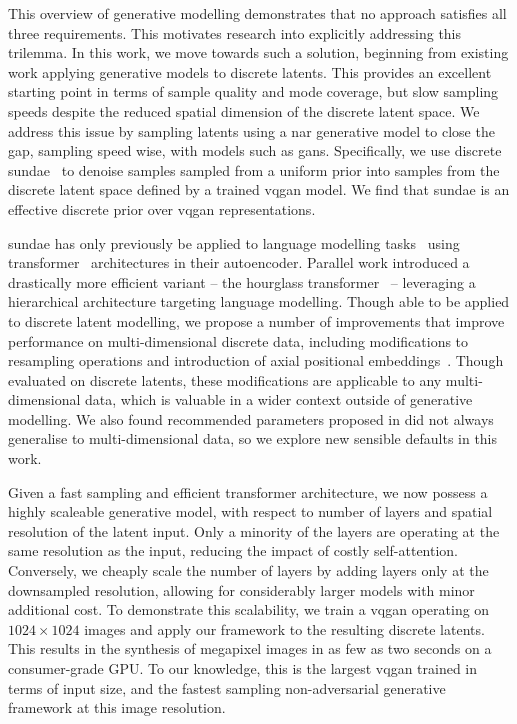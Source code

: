 This overview of generative modelling demonstrates that no approach satisfies
all three requirements. This motivates research into explicitly addressing this
trilemma. In this work, we move towards such a solution, beginning from existing
work applying generative models to discrete latents. This provides an excellent
starting point in terms of sample quality and mode coverage, but slow sampling
speeds despite the reduced spatial dimension of the discrete latent space. We
address this issue by sampling latents using a \gls{nar} generative model to
close the gap, sampling speed wise, with models such as \glspl{gan}.
Specifically, we use discrete \gls{sundae}~\cite{savinov2022stepunrolled} to
denoise samples sampled from a uniform prior into samples from the discrete
latent space defined by a trained \gls{vqgan} model. We find that
\gls{sundae} is an effective discrete prior over \gls{vqgan} representations.

\Gls{sundae} has only previously be applied to language modelling
tasks~\cite{savinov2022stepunrolled} using
transformer~\cite{vaswani2017attention} architectures in their autoencoder.
Parallel work introduced a drastically more efficient variant -- the hourglass
transformer~\cite{nawrot2021hierarchical} -- leveraging a hierarchical
architecture targeting language modelling. Though able to be applied to discrete
latent modelling, we propose a number of improvements that improve performance on
multi-dimensional discrete data, including modifications to resampling
operations and introduction of axial positional
embeddings~\cite{su2021roformer}. Though evaluated on discrete latents, these
modifications are applicable to any multi-dimensional data,
which is valuable in a wider context outside of generative modelling. We
also found recommended parameters proposed in \citet{savinov2022stepunrolled}
did not always generalise to multi-dimensional data, so we explore new sensible
defaults in this work.

Given a fast sampling and efficient transformer architecture, we now possess a
highly scaleable generative model, with respect to number of layers and spatial
resolution of the latent input. Only a minority of the layers are operating at
the same resolution as the input, reducing the impact of costly self-attention.
Conversely, we cheaply scale the number of layers by adding layers only at the
downsampled resolution, allowing for considerably larger models with minor
additional cost. To demonstrate this scalability, we train a \gls{vqgan}
operating on $1024 \times 1024$ images and apply our framework to the resulting
discrete latents. This results in the synthesis of megapixel images in as few as
two seconds on a consumer-grade GPU. To our knowledge, this is the largest
\gls{vqgan} trained in terms of input size, and the fastest sampling
non-adversarial generative framework at this image resolution.

